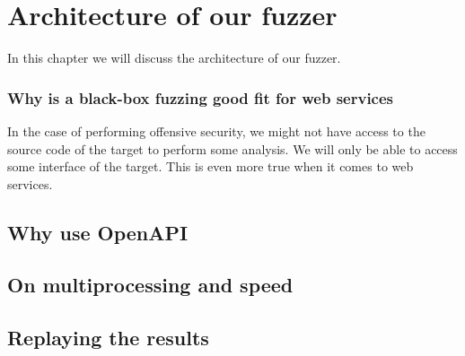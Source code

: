 \chapter{Architecture of our fuzzer}
In this chapter we will discuss the architecture of our fuzzer.

\subsection{Why is a black-box fuzzing good fit for web services}
In the case of performing offensive security, we might not have access to the source code of the target to perform some analysis. We will only be able to access some interface of the target. This is even more true when it comes to web services.

\section{Why use OpenAPI}

\section{On multiprocessing and speed}

\section{Replaying the results}

